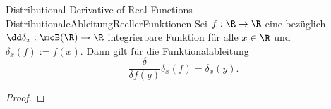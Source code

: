 \begin{msat}{Distributional Derivative of Real Functions}
    {DistributionaleAbleitungReellerFunktionen}
    Sei $f:\R\to\R$ eine bezüglich $\dd\delta_x:\mcB(\R)\to\R$ integrierbare Funktion für alle $x\in\R$ und $\delta_x(f):=f(x)$. Dann gilt für die Funktionalableitung 
    \[
        \frac{\delta}{\delta f(y)}\delta_x(f) = \delta_x(y).
    \]
\end{msat}
\begin{proof}
    
\end{proof}